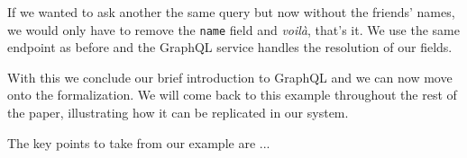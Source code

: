 If we wanted to ask another the same query but now without the friends' names, we would only have to remove the \texttt{name} field and \textit{voilà}, that's it. We use the same endpoint as before and the GraphQL service handles the resolution of our fields.

With this we conclude our brief introduction to GraphQL and we can now move onto the formalization. We will come back to this example throughout the rest of the paper, illustrating how it can be replicated in our system.

The key points to take from our example are ... 


